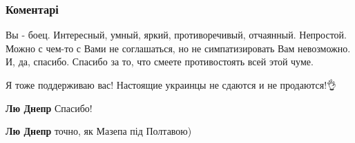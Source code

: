  
 
 
 
 
\subsubsection{Коментарі}
\label{sec:08_09_2021.fb.krjukova_svetlana.1.svetofor_podderzhka_voditel.cmt}

\begin{itemize}
 
Вы - боец. Интересный, умный, яркий, противоречивый, отчаянный. Непростой.
Можно с чем-то с Вами не соглашаться, но не симпатизировать Вам невозможно.
И, да, спасибо. Спасибо за то, что смеете противостоять всей этой чуме.

 
Я тоже поддерживаю вас! Настоящие украинцы не сдаются и не продаются!👌

\begin{itemize}
 
\textbf{Лю Днепр} Спасибо!

 
\textbf{Лю Днепр} точно, як Мазепа під Полтавою)
\end{itemize}


\end{itemize}
